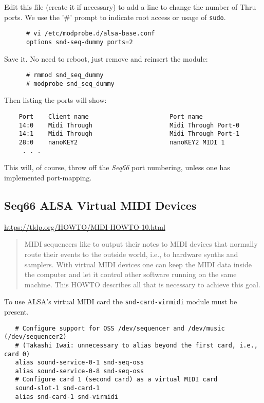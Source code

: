    Edit this file (create it if necessary) to add a line to change the number
   of Thru ports.  We use the '\#' prompt to indicate root access or usage of
   \texttt{sudo}.

   \begin{verbatim}
      # vi /etc/modprobe.d/alsa-base.conf
      options snd-seq-dummy ports=2
   \end{verbatim}

   Save it.  No need to reboot, just remove and reinsert the module:

   \begin{verbatim}
      # rmmod snd_seq_dummy
      # modprobe snd_seq_dummy
   \end{verbatim}

   Then listing the ports will show:

   \begin{verbatim}
    Port    Client name                      Port name
    14:0    Midi Through                     Midi Through Port-0
    14:1    Midi Through                     Midi Through Port-1
    28:0    nanoKEY2                         nanoKEY2 MIDI 1
     . . .
   \end{verbatim}

   This will, of course, throw off the \textsl{Seq66} port numbering, unless
   one has implemented port-mapping.

\subsection{Seq66 ALSA Virtual MIDI Devices}
\label{subsec:alsa_virtual_midi_devices}

   \url{https://tldp.org/HOWTO/MIDI-HOWTO-10.html}

   \begin{quote}
   MIDI sequencers like to output their notes to MIDI devices that normally
   route their events to the outside world, i.e., to hardware synths and
   samplers. With virtual MIDI devices one can keep the MIDI data inside the
   computer and let it control other software running on the same machine. This
   HOWTO describes all that is necessary to achieve this goal.
   \end{quote}

   To use ALSA's virtual MIDI card the
   \texttt{snd-card-virmidi} module must be present. 

   \begin{verbatim}
   # Configure support for OSS /dev/sequencer and /dev/music (/dev/sequencer2)
   # (Takashi Iwai: unnecessary to alias beyond the first card, i.e., card 0)
   alias sound-service-0-1 snd-seq-oss
   alias sound-service-0-8 snd-seq-oss
   # Configure card 1 (second card) as a virtual MIDI card
   sound-slot-1 snd-card-1
   alias snd-card-1 snd-virmidi
   \end{verbatim}

